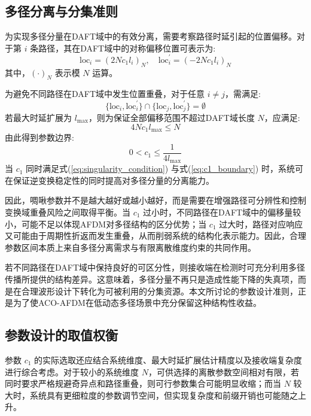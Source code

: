 \subsection{多径分离与分集准则}
\label{subsec:multipath_separation}

为实现多径分量在DAFT域中的有效分离，需要考察路径时延引起的位置偏移。对于第 $i$ 条路径，其在DAFT域中的对称偏移位置可表示为:
\begin{equation}
    \mathrm{loc}_i = (2N c_1 l_i)_N, \quad \mathrm{loc}_i^{\prime} = (-2N c_1 l_i)_N
\end{equation}
其中，$(\cdot)_N$ 表示模 $N$ 运算。

为避免不同路径在DAFT域中发生位置重叠，对于任意 $i \neq j$，需满足:
\begin{equation}
    \{ \mathrm{loc}_i, \mathrm{loc}_i^{\prime} \} \cap \{ \mathrm{loc}_j, \mathrm{loc}_j^{\prime} \} = \emptyset
\end{equation}
若最大时延扩展为 $l_{\max}$，则为保证全部偏移范围不超过DAFT域长度 $N$，应满足:
\begin{equation} 
    4N c_1 l_{\max} \leq N
\end{equation}
由此得到参数边界:
\begin{equation}
    0 < c_1 \leq \frac{1}{4 l_{\max}}
    \label{eq:c1_boundary}
\end{equation}
当 $c_1$ 同时满足式(\ref{eq:singularity_condition}) 与式(\ref{eq:c1_boundary}) 时，系统可在保证逆变换稳定性的同时提高对多径分量的分离能力。

因此，啁啾参数并不是越大越好或越小越好，而是需要在增强路径可分辨性和控制变换域重叠风险之间取得平衡。当 $c_1$ 过小时，不同路径在DAFT域中的偏移量较小，可能不足以体现AFDM对多径结构的区分优势；当 $c_1$ 过大时，路径对应响应又可能由于周期性折返而发生重叠，从而削弱系统的结构化表示能力。因此，合理参数区间本质上来自多径分离需求与有限离散维度约束的共同作用。

若不同路径在DAFT域中保持良好的可区分性，则接收端在检测时可充分利用多径传播所提供的结构差异。这意味着，多径分量不再只是造成性能下降的失真项，而是在合理波形设计下转化为可被利用的分集资源。本文所讨论的参数设计准则，正是为了使ACO-AFDM在低动态多径场景中充分保留这种结构性收益。

\subsection{参数设计的取值权衡}
\label{subsec:param_tradeoff}

参数 $c_1$ 的实际选取还应结合系统维度、最大时延扩展估计精度以及接收端复杂度进行综合考虑。对于较小的系统维度 $N$，可供选择的离散参数空间相对有限，若同时要求严格规避奇异点和路径重叠，则可行参数集合可能明显收缩；而当 $N$ 较大时，系统具有更细粒度的参数调节空间，但实现复杂度和前缀开销也可能随之上升。


